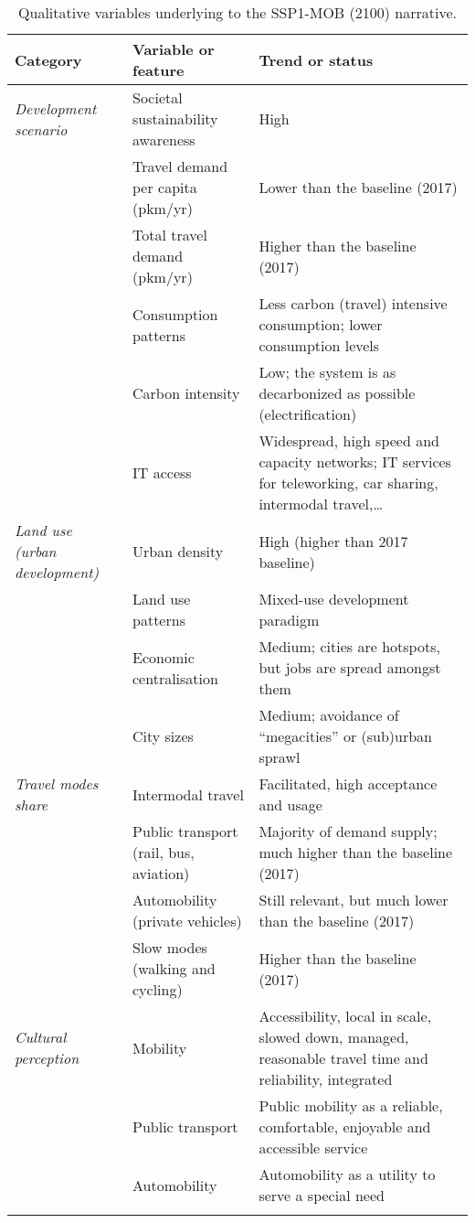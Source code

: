 \begin{table}
\centering
\caption[SSP1-MOB (2100) qualitative variables]{Qualitative variables underlying to the SSP1-MOB (2100) narrative.}
\label{t:ssp1-mob-2100-narrative-thesis}
\scriptsize
\begin{tabular}{p{2.5cm}p{3cm}p{8cm}}
\toprule
Category & Variable or feature & Trend or status \\ \midrule
\textit{Development scenario} & Societal sustainability awareness & High \\
 & Travel demand per capita (pkm/yr) & Lower than the baseline (2017) \\
 & Total travel demand (pkm/yr) & Higher than the baseline (2017) \\
 & Consumption patterns & Less carbon (travel) intensive consumption; lower consumption levels \\
 & Carbon intensity & Low; the system is as decarbonized as possible (electrification) \\
 & IT access & Widespread, high speed and capacity networks; IT services for teleworking, car sharing, intermodal travel,\ldots\\\addlinespace
\textit{Land use (urban development)} & Urban density & High (higher than 2017 baseline) \\
 & Land use patterns & Mixed-use development paradigm \\
 & Economic centralisation & Medium; cities are hotspots, but jobs are spread amongst them \\
 & City sizes & Medium; avoidance of ``megacities'' or (sub)urban sprawl \\\addlinespace
\textit{Travel modes share} & Intermodal travel & Facilitated, high acceptance and usage \\
 & Public transport (rail, bus, aviation) & Majority of demand supply; much higher than the baseline (2017) \\
 & Automobility (private vehicles) & Still relevant, but much lower than the baseline (2017) \\
 & Slow modes (walking and cycling) & Higher than the baseline (2017) \\\addlinespace
\textit{Cultural perception} & Mobility & Accessibility, local in scale, slowed down, managed, reasonable travel time and reliability, integrated \\
 & Public transport & Public mobility as a reliable, comfortable, enjoyable and accessible service \\
 & Automobility & Automobility as a utility to serve a special need \\\addlinespace

\end{tabular}
\end{table}
